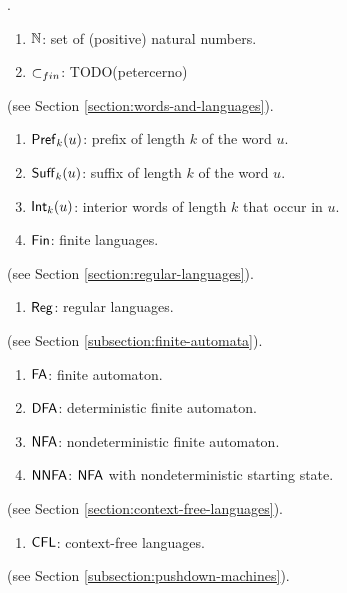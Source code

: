 
.

\begin{enumerate}[]
\item $\mathbb{N}$: set of (positive) natural numbers.
\item $\subset_{fin}$: TODO(petercerno)
\end{enumerate}

 (see Section \ref{section:words-and-languages}).

\begin{enumerate}[]
\item $\textup{\sf Pref\/}_k(u)$: prefix of length $k$ of the word $u$.
\item $\textup{\sf Suff\/}_k(u)$: suffix of length $k$ of the word $u$.
\item $\textup{\sf Int\/}_k(u)$: interior words of length $k$ that occur in $u$.
\item $\textup{\sf Fin}$: finite languages.
\end{enumerate}

 (see Section \ref{section:regular-languages}).

\begin{enumerate}[]
\item $\textup{\sf Reg}$: regular languages.
\end{enumerate}

 (see Section \ref{subsection:finite-automata}).

\begin{enumerate}[]
\item $\textup{\sf FA}$: finite automaton.
\item $\textup{\sf DFA}$: deterministic finite automaton.
\item $\textup{\sf NFA}$: nondeterministic finite automaton.
\item $\textup{\sf NNFA}$: $\textup{\sf NFA}$ with nondeterministic starting state.
\end{enumerate}

 (see Section \ref{section:context-free-languages}).

\begin{enumerate}[]
\item $\textup{\sf CFL}$: context-free languages.
\end{enumerate}

 (see Section \ref{subsection:pushdown-machines}).

